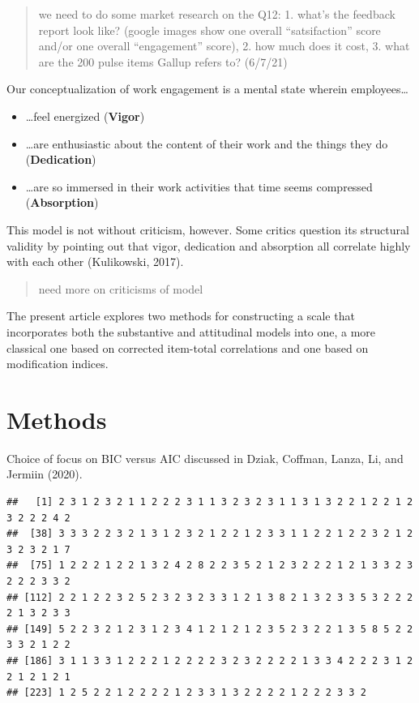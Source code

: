 \documentclass[
  english,
  man]{apa6}
\providecommand{\tightlist}{%
  \setlength{\itemsep}{0pt}\setlength{\parskip}{0pt}}
\begin{document}
\begin{quote}
we need to do some market research on the Q12: 1. what's the feedback report look like? (google images show one overall ``satsifaction'' score and/or one overall ``engagement'' score), 2. how much does it cost, 3. what are the 200 pulse items Gallup refers to? (6/7/21)
\end{quote}

Our conceptualization of work engagement is a mental state wherein employees\ldots{}

\begin{itemize}
\tightlist
\item
  \ldots feel energized (\textbf{Vigor})
\item
  \ldots are enthusiastic about the content of their work and the things they do (\textbf{Dedication})
\item
  \ldots are so immersed in their work activities that time seems compressed (\textbf{Absorption})
\end{itemize}

This model is not without criticism, however. Some critics question its structural validity by pointing out that vigor, dedication and absorption all correlate highly with each other (Kulikowski, 2017).

\begin{quote}
need more on criticisms of model
\end{quote}

The present article explores two methods for constructing a scale that incorporates both the substantive and attitudinal models into one, a more classical one based on corrected item-total correlations and one based on modification indices.

\hypertarget{methods}{%
\section{Methods}\label{methods}}

Choice of focus on BIC versus AIC discussed in Dziak, Coffman, Lanza, Li, and Jermiin (2020).

\begin{verbatim}
##   [1] 2 3 1 2 3 2 1 1 2 2 2 3 1 1 3 2 3 2 3 1 1 3 1 3 2 2 1 2 2 1 2 3 2 2 2 4 2
##  [38] 3 3 3 2 2 3 2 1 3 1 2 3 2 1 2 2 1 2 3 3 1 1 2 2 1 2 2 3 2 1 2 3 2 3 2 1 7
##  [75] 1 2 2 2 1 2 2 1 3 2 4 2 8 2 2 3 5 2 1 2 3 2 2 2 1 2 1 3 3 2 3 2 2 2 3 3 2
## [112] 2 2 1 2 2 3 2 5 2 3 2 3 2 3 3 1 2 1 3 8 2 1 3 2 3 3 5 3 2 2 2 2 1 3 2 3 3
## [149] 5 2 2 3 2 1 2 3 1 2 3 4 1 2 1 2 1 2 3 5 2 3 2 2 1 3 5 8 5 2 2 3 3 2 1 2 2
## [186] 3 1 1 3 3 1 2 2 2 1 2 2 2 2 3 2 3 2 2 2 2 1 3 3 4 2 2 2 3 1 2 2 1 2 1 2 1
## [223] 1 2 5 2 2 1 2 2 2 2 1 2 3 3 1 3 2 2 2 2 1 2 2 2 3 3 2
\end{verbatim}
\end{document}
